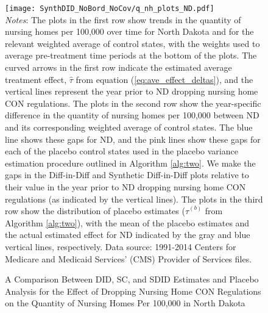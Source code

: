 \documentclass[../Main.tex]{subfiles}
\begin{document}
\newpage
{}
\begin{figure}[t] 
    \setlength{}
	\caption{\label{fig:q_nh_plots_nd} \centering A Comparison Between DID, SC, and SDID Estimates and Placebo Analysis for the Effect of Dropping Nursing Home CON Regulations on the Quantity of Nursing Homes Per 100,000 in North Dakota} {\centering\texttt{[image: SynthDID\_NoBord\_NoCov/q\_nh\_plots\_ND.pdf]}}
    \vspace{-1.4cm}\\
    \scriptsize
		\textit{Notes}: The plots in the first row show trends in the quantity of nursing homes per 100,000 over time for North Dakota and for the relevant weighted average of control states, with the weights used to average pre-treatment time periods at the bottom of the plots. The curved arrows in the first row indicate the estimated average treatment effect, $\hat{\tau}$ from equation (\ref{eq:ave_effect_deltas}), and the vertical lines represent the year prior to ND dropping nursing home CON regulations. The plots in the second row show the year-specific difference in the quantity of nursing homes per 100,000 between ND and its corresponding weighted average of control states. The blue line shows these gaps for ND, and the pink lines show these gaps for each of the placebo control states used in the placebo variance estimation procedure outlined in Algorithm \ref{alg:two}. We make the gaps in the Diff-in-Diff and Synthetic Diff-in-Diff plots relative to their value in the year prior to ND dropping nursing home CON regulations (as indicated by the vertical lines). The plots in the third row show the distribution of placebo estimates ($\hat{\tau}^{(b)}$ from Algorithm \ref{alg:two}), with the mean of the placebo estimates and the actual estimated effect for ND indicated by the gray and blue vertical lines, respectively. Data source: 1991-2014 Centers for Medicare and Medicaid Services’ (CMS) Provider of Services files.
\end{figure}
\restoregeometry
\clearpage
\end{document}
